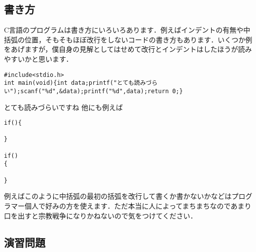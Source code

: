 \documentclass[a4j,titlepage,dvipdfmx]{jsarticle}   %
\begin{document}
\subsection{書き方}
C言語のプログラムは書き方にいろいろあります．例えばインデントの有無や中括弧の位置，そもそもほぼ改行をしないコードの書き方もあります．いくつか例をあげますが，僕自身の見解としてはせめて改行とインデントはしたほうが読みやすいかと思います．
\begin{lstlisting}
#include<stdio.h>
int main(void){int data;printf("とても読みづらい");scanf("%d",&data);printf("%d",data);return 0;}
\end{lstlisting}
とても読みづらいですね
他にも例えば
\begin{lstlisting}
if(){

}

if()
{

}
\end{lstlisting}
例えばこのように中括弧の最初の括弧を改行して書くか書かないかなどはプログラマー個人で好みの方を使えます．ただ本当に人によってまちまちなのであまり口を出すと宗教戦争になりかねないので気をつけてください．

\subsection{演習問題}
\end{document}
